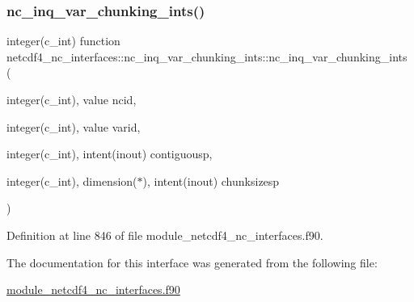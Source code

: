\subsubsection{\texorpdfstring{nc\+\_\+inq\+\_\+var\+\_\+chunking\+\_\+ints()}{nc\_inq\_var\_chunking\_ints()}}
{\footnotesize\ttfamily integer(c\+\_\+int) function netcdf4\+\_\+nc\+\_\+interfaces\+::nc\+\_\+inq\+\_\+var\+\_\+chunking\+\_\+ints\+::nc\+\_\+inq\+\_\+var\+\_\+chunking\+\_\+ints (\begin{DoxyParamCaption}\item[{integer(c\+\_\+int), value}]{ncid,  }\item[{integer(c\+\_\+int), value}]{varid,  }\item[{integer(c\+\_\+int), intent(inout)}]{contiguousp,  }\item[{integer(c\+\_\+int), dimension($\ast$), intent(inout)}]{chunksizesp }\end{DoxyParamCaption})}



Definition at line 846 of file module\+\_\+netcdf4\+\_\+nc\+\_\+interfaces.\+f90.



The documentation for this interface was generated from the following file\+:\begin{DoxyCompactItemize}
\item 
\hyperlink{module__netcdf4__nc__interfaces_8f90}{module\+\_\+netcdf4\+\_\+nc\+\_\+interfaces.\+f90}\end{DoxyCompactItemize}

